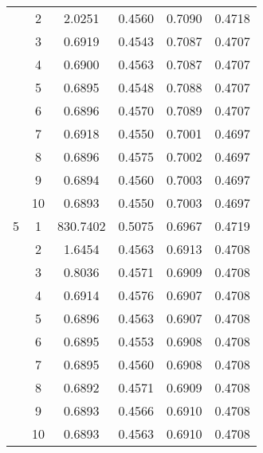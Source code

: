\begin{longtable}{|c|c|c|c|c|c|}
& 2 & 2.0251 & 0.4560 & 0.7090 & 0.4718 \\
& 3 & 0.6919 & 0.4543 & 0.7087 & 0.4707 \\
& 4 & 0.6900 & 0.4563 & 0.7087 & 0.4707 \\
& 5 & 0.6895 & 0.4548 & 0.7088 & 0.4707 \\
& 6 & 0.6896 & 0.4570 & 0.7089 & 0.4707 \\
& 7 & 0.6918 & 0.4550 & 0.7001 & 0.4697 \\
& 8 & 0.6896 & 0.4575 & 0.7002 & 0.4697 \\
& 9 & 0.6894 & 0.4560 & 0.7003 & 0.4697 \\
& 10 & 0.6893 & 0.4550 & 0.7003 & 0.4697 \\
\hline
5 & 1 & 830.7402 & 0.5075 & 0.6967 & 0.4719 \\
& 2 & 1.6454 & 0.4563 & 0.6913 & 0.4708 \\
& 3 & 0.8036 & 0.4571 & 0.6909 & 0.4708 \\
& 4 & 0.6914 & 0.4576 & 0.6907 & 0.4708 \\
& 5 & 0.6896 & 0.4563 & 0.6907 & 0.4708 \\
& 6 & 0.6895 & 0.4553 & 0.6908 & 0.4708 \\
& 7 & 0.6895 & 0.4560 & 0.6908 & 0.4708 \\
& 8 & 0.6892 & 0.4571 & 0.6909 & 0.4708 \\
& 9 & 0.6893 & 0.4566 & 0.6910 & 0.4708 \\
& 10 & 0.6893 & 0.4563 & 0.6910 & 0.4708 \\
\hline

\end{longtable}

